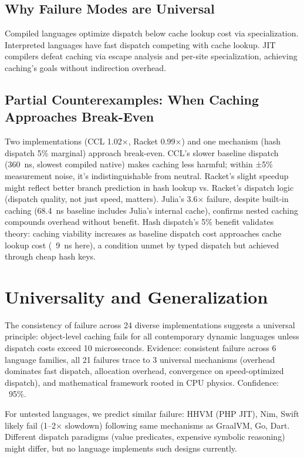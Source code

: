 \documentclass[sigplan,final,acmsmall,review,screen]{acmart}
\begin{document}
\subsection{Why Failure Modes are Universal}

Compiled languages optimize dispatch below cache lookup cost via specialization. Interpreted languages have fast dispatch competing with cache lookup. JIT compilers defeat caching via escape analysis and per-site specialization, achieving caching's goals without indirection overhead.

\subsection{Partial Counterexamples: When Caching Approaches Break-Even}
\label{sec:counterexamples}

Two implementations (CCL 1.02×, Racket 0.99×) and one mechanism (hash dispatch 5\% marginal) approach break-even. CCL's slower baseline dispatch (360~ns, slowest compiled native) makes caching less harmful; within ±5\% measurement noise, it's indistinguishable from neutral. Racket's slight speedup might reflect better branch prediction in hash lookup vs. Racket's dispatch logic (dispatch quality, not just speed, matters). Julia's 3.6× failure, despite built-in caching (68.4~ns baseline includes Julia's internal cache), confirms nested caching compounds overhead without benefit. Hash dispatch's 5\% benefit validates theory: caching viability increases as baseline dispatch cost approaches cache lookup cost (~9~ns here), a condition unmet by typed dispatch but achieved through cheap hash keys.

\section{Universality and Generalization}

The consistency of failure across 24 diverse implementations suggests a universal principle: object-level caching fails for all contemporary dynamic languages unless dispatch costs exceed 10 microseconds. Evidence: consistent failure across 6 language families, all 21 failures trace to 3 universal mechanisms (overhead dominates fast dispatch, allocation overhead, convergence on speed-optimized dispatch), and mathematical framework rooted in CPU physics. Confidence: ~95\%.

For untested languages, we predict similar failure: HHVM (PHP JIT), Nim, Swift likely fail (1--2× slowdown) following same mechanisms as GraalVM, Go, Dart. Different dispatch paradigms (value predicates, expensive symbolic reasoning) might differ, but no language implements such designs currently.
\end{document}
